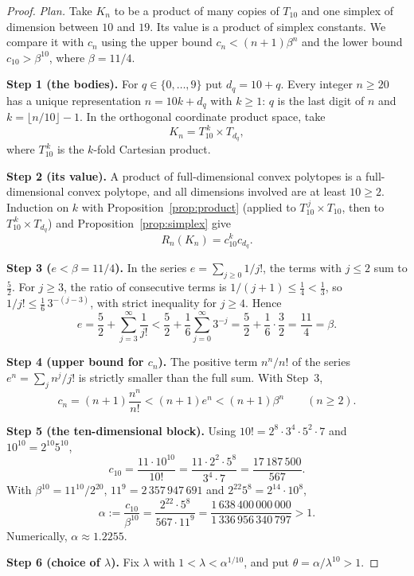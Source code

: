 \documentclass[11pt]{article}
\newcommand{\step}[1]{\smallskip\noindent\textbf{#1}}
\begin{document}
\begin{proof}
\emph{Plan.} Take \(K_n\) to be a product of many copies of \(T_{10}\) and
one simplex of dimension between \(10\) and \(19\). Its value is a product
of simplex constants. We compare it with \(c_n\) using the upper bound
\(c_n<(n+1)\beta^n\) and the lower bound \(c_{10}>\beta^{10}\), where
\(\beta=11/4\).

\step{Step 1 (the bodies).} For \(q\in\{0,\ldots,9\}\) put \(d_q=10+q\).
Every integer \(n\ge20\) has a unique representation \(n=10k+d_q\) with
\(k\ge1\): \(q\) is the last digit of \(n\) and
\(k=\lfloor n/10\rfloor-1\). In the orthogonal coordinate product space,
take
\[
 K_n=T_{10}^{\,k}\times T_{d_q},
\]
where \(T_{10}^{\,k}\) is the \(k\)-fold Cartesian product.

\step{Step 2 (its value).} A product of full-dimensional convex polytopes
is a full-dimensional convex polytope, and all dimensions involved are at
least \(10\ge2\). Induction on \(k\) with Proposition~\ref{prop:product}
(applied to \(T_{10}^{\,j}\times T_{10}\), then to
\(T_{10}^{\,k}\times T_{d_q}\)) and Proposition~\ref{prop:simplex} give
\[
 R_n(K_n)=c_{10}^k c_{d_q}.
\]

\step{Step 3 (\(e<\beta=11/4\)).} In the series
\(e=\sum_{j\ge0}1/j!\), the terms with \(j\le2\) sum to \(\tfrac52\). For
\(j\ge3\), the ratio of consecutive terms is \(1/(j+1)\le\tfrac14<\tfrac13\),
so \(1/j!\le\tfrac16\,3^{-(j-3)}\), with strict inequality for \(j\ge4\).
Hence
\[
 e=\frac52+\sum_{j=3}^{\infty}\frac1{j!}
 <\frac52+\frac16\sum_{j=0}^{\infty}3^{-j}
 =\frac52+\frac16\cdot\frac32
 =\frac{11}4=\beta.
\]

\step{Step 4 (upper bound for \(c_n\)).} The positive term \(n^n/n!\) of
the series \(e^n=\sum_jn^j/j!\) is strictly smaller than the full sum.
With Step~3,
\[
 c_n=(n+1)\frac{n^n}{n!}<(n+1)e^n<(n+1)\beta^n\qquad(n\ge2).
\]

\step{Step 5 (the ten-dimensional block).} Using
\(10!=2^8\cdot3^4\cdot5^2\cdot7\) and \(10^{10}=2^{10}5^{10}\),
\[
 c_{10}=\frac{11\cdot10^{10}}{10!}
 =\frac{11\cdot2^2\cdot5^8}{3^4\cdot7}
 =\frac{17\,187\,500}{567}.
\]
With \(\beta^{10}=11^{10}/2^{20}\), \(11^9=2\,357\,947\,691\) and
\(2^{22}5^8=2^{14}\cdot10^8\),
\[
 \alpha:=\frac{c_{10}}{\beta^{10}}
 =\frac{2^{22}\cdot5^8}{567\cdot11^9}
 =\frac{1\,638\,400\,000\,000}{1\,336\,956\,340\,797}>1 .
\]
Numerically, \(\alpha\approx1.2255\).

\step{Step 6 (choice of \(\lambda\)).} Fix \(\lambda\) with
\(1<\lambda<\alpha^{1/10}\), and put \(\theta=\alpha/\lambda^{10}>1\).


\end{proof}
\end{document}
